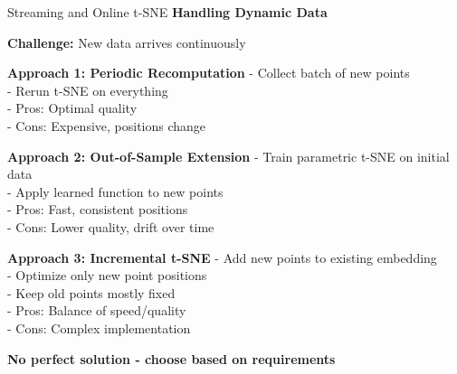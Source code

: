 \documentclass[10pt]{beamer}
\newcommand{\emphtext}[1]{\textcolor{upcblue}{\textbf{#1}}}
\newcommand{\warningbox}[1]{\colorbox{red!10}{\begin{minipage}{0.85\textwidth}\centering #1\end{minipage}}}
\begin{document}
\begin{frame}{Streaming and Online t-SNE}
\emphtext{Handling Dynamic Data}

\vspace{0.3cm}
\textbf{Challenge:} New data arrives continuously

\vspace{0.3cm}
\textbf{Approach 1: Periodic Recomputation}
\footnotesize
- Collect batch of new points\\
- Rerun t-SNE on everything\\
- Pros: Optimal quality\\
- Cons: Expensive, positions change

\vspace{0.2cm}
\textbf{Approach 2: Out-of-Sample Extension}
\footnotesize
- Train parametric t-SNE on initial data\\
- Apply learned function to new points\\
- Pros: Fast, consistent positions\\
- Cons: Lower quality, drift over time

\vspace{0.2cm}
\textbf{Approach 3: Incremental t-SNE}
\footnotesize
- Add new points to existing embedding\\
- Optimize only new point positions\\
- Keep old points mostly fixed\\
- Pros: Balance of speed/quality\\
- Cons: Complex implementation

\begin{center}
\warningbox{\footnotesize\textbf{No perfect solution - choose based on requirements}}
\end{center}
\end{frame}
\end{document}
